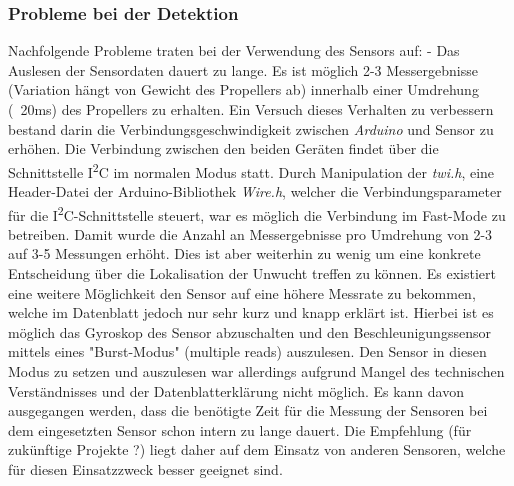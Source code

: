 \subsubsection*{Probleme bei der Detektion}
Nachfolgende Probleme traten bei der Verwendung des Sensors auf:
- Das Auslesen der Sensordaten dauert zu lange. Es ist möglich 2-3 Messergebnisse (Variation hängt von Gewicht des Propellers ab) innerhalb einer Umdrehung (~20ms) des Propellers zu erhalten. Ein Versuch dieses Verhalten zu verbessern bestand darin die Verbindungsgeschwindigkeit zwischen \textit{Arduino} und Sensor zu erhöhen. Die Verbindung zwischen den beiden Geräten findet über die Schnittstelle I\textsuperscript{2}C im normalen Modus statt. Durch Manipulation der \textit{twi.h}, eine Header-Datei der Arduino-Bibliothek \textit{Wire.h}, welcher die Verbindungsparameter für die I\textsuperscript{2}C-Schnittstelle steuert, war es möglich die Verbindung im Fast-Mode zu betreiben. Damit wurde die Anzahl an Messergebnisse pro Umdrehung von 2-3 auf 3-5 Messungen erhöht. Dies ist aber weiterhin zu wenig um eine konkrete Entscheidung über die Lokalisation der Unwucht treffen zu können.
Es existiert eine weitere Möglichkeit den Sensor auf eine höhere Messrate zu bekommen, welche im Datenblatt jedoch nur sehr kurz und knapp erklärt ist. Hierbei ist es möglich das Gyroskop des Sensor abzuschalten und den Beschleunigungssensor mittels eines "Burst-Modus" (multiple reads) auszulesen. Den Sensor in diesen Modus zu setzen und auszulesen war allerdings aufgrund Mangel des technischen Verständnisses und der Datenblatterklärung nicht möglich.
Es kann davon ausgegangen werden, dass die benötigte Zeit für die Messung der Sensoren bei dem eingesetzten Sensor schon intern zu lange dauert. Die Empfehlung (für zukünftige Projekte ?) liegt daher auf dem Einsatz von anderen Sensoren, welche für diesen Einsatzzweck besser geeignet sind.
